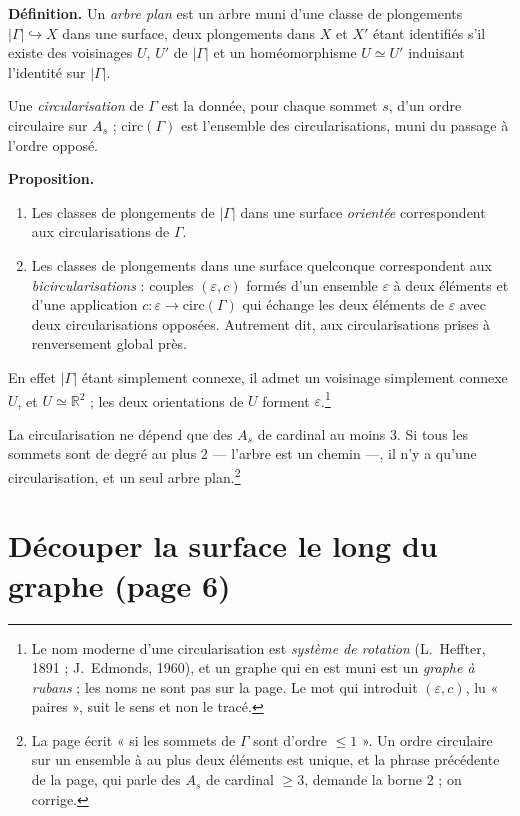 \documentclass[11pt,a4paper]{article}
\begin{document}
\textbf{Définition.} Un \emph{arbre plan} est un arbre muni d'une classe de
plongements $|\Gamma| \hookrightarrow X$ dans une surface, deux plongements
dans $X$ et $X'$ étant identifiés s'il existe des voisinages $U$, $U'$ de
$|\Gamma|$ et un homéomorphisme $U \simeq U'$ induisant l'identité sur
$|\Gamma|$.

Une \emph{circularisation} de $\Gamma$ est la donnée, pour chaque sommet $s$,
d'un ordre circulaire sur $A_{s}$ ; $\mathrm{circ}(\Gamma)$ est l'ensemble des
circularisations, muni du passage à l'ordre opposé.

\textbf{Proposition.}
\begin{enumerate}
\item[(i)] Les classes de plongements de $|\Gamma|$ dans une surface
\emph{orientée} correspondent aux circularisations de $\Gamma$.
\item[(ii)] Les classes de plongements dans une surface quelconque correspondent
aux \emph{bicircularisations} : couples $(\varepsilon, c)$ formés d'un ensemble
$\varepsilon$ à deux éléments et d'une application $c : \varepsilon \to
\mathrm{circ}(\Gamma)$ qui échange les deux éléments de $\varepsilon$ avec deux
circularisations opposées. Autrement dit, aux circularisations prises à
renversement global près.
\end{enumerate}
En effet $|\Gamma|$ étant simplement connexe, il admet un voisinage simplement
connexe $U$, et $U \simeq \mathbb{R}^{2}$ ; les deux orientations de $U$
forment $\varepsilon$.\footnote{Le nom moderne d'une circularisation est
\emph{système de rotation} (L.~Heffter, 1891 ; J.~Edmonds, 1960), et un graphe
qui en est muni est un \emph{graphe à rubans} ; les noms ne sont pas sur la
page. Le mot qui introduit $(\varepsilon, c)$, lu « paires », suit le sens et non
le tracé.}

La circularisation ne dépend que des $A_{s}$ de cardinal au moins 3. Si tous
les sommets sont de degré au plus 2 --- l'arbre est un chemin ---, il n'y a
qu'une circularisation, et un seul arbre plan.\footnote{La page écrit « si les
sommets de $\Gamma$ sont d'ordre $\leq 1$ ». Un ordre circulaire sur un ensemble
à au plus deux éléments est unique, et la phrase précédente de la page, qui
parle des $A_{s}$ de cardinal $\geq 3$, demande la borne 2 ; on corrige.}

\section*{Découper la surface le long du graphe (page 6)}
\end{document}
